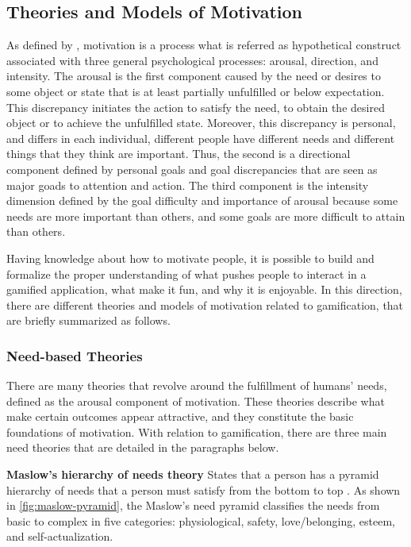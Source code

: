 \subsection{Theories and Models of Motivation}
\label{subsec:theories-motivation}

As defined by , motivation is a process what is referred as hypothetical construct associated with three general psychological processes: arousal, direction, and intensity.
The arousal is the first component caused by the need or desires to some object or state that is at least partially unfulfilled or below expectation.
This discrepancy initiates the action to satisfy the need, to obtain the desired object or to achieve the unfulfilled state.
Moreover, this discrepancy is personal, and differs in each individual, different people have different needs and different things that they think are important.
Thus, the second is a directional component defined by personal goals and goal discrepancies that are seen as major goads to attention and action.
The third component is the intensity dimension defined by the goal difficulty and importance of arousal because some needs are more important than others, and some goals are more difficult to attain than others.

Having knowledge about how to motivate people, it is possible to build and formalize the proper understanding of what pushes people to interact in a gamified application, what make it fun, and why it is enjoyable.
In this direction, there are different theories and models of motivation related to gamification, that are briefly summarized as follows. 


\subsubsection{Need-based Theories}
\label{subsubsec:need-theories}

There are many theories that revolve around the fulfillment of humans' needs, defined as the arousal component of motivation. 
These theories describe what make certain outcomes appear attractive, and they constitute the basic foundations of motivation. 
With relation to gamification, there are three main need theories that are detailed in the paragraphs below.

\textbf{Maslow's hierarchy of needs theory} States that a person has a pyramid hierarchy of needs that a person must satisfy from the bottom to top \cite{Maslow1954,Goble1970}.
As shown in \autoref{fig:maslow-pyramid}, the Maslow's need pyramid classifies the needs from basic to complex in five categories: physiological, safety, love/belonging, esteem, and self-actualization.

